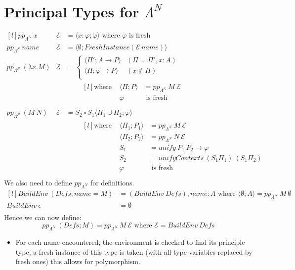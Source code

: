\section{Principal Types for $\Lambda^N$}
\[\begin{matrix*}[l]
    pp_{\Lambda^N} \ x & \mathcal{E} & = \langle x: \varphi ; \varphi \rangle \text{ where } \varphi \text{ is fresh} \\
    pp_{\Lambda^N} \ name & \mathcal{E} & = \langle \emptyset ; FreshInstance(\mathcal{E} \ name) \rangle \\
    pp_{\Lambda^N} \ (\lambda x . M) & \mathcal{E} & = \begin{cases}
        \langle \Pi'; A \to P \rangle & (\Pi = \Pi', x:A) \\
        \langle \Pi; \varphi \to P \rangle & (x \not\in \Pi) \\
    \end{cases} \\
    & & \qquad \begin{matrix*}[l]
        \text{where } & \langle \Pi; P \rangle & = pp_{\Lambda^N} \ M \ \mathcal{E} \\
        & \varphi & \text{ is fresh} \\
    \end{matrix*} \\
    pp_{\Lambda^N} \ (M \ N) & \mathcal{E} & = S_2 \circ S_1 \langle \Pi_1 \cup \Pi_2 ; \varphi \rangle \\
    & & \qquad \begin{matrix*}[l]
        \text{where } & \langle \Pi_1 ; P_1 \rangle & = pp_{\Lambda^N} \ M \ \mathcal{E} \\
        & \langle \Pi_2 ; P_2 \rangle & = pp_{\Lambda^N} \ N \ \mathcal{E} \\
        & S_1 & = unify \ P_1 \ P_2 \to \varphi \\
        & S_2 & = unifyContexts \ (S_1 \Pi_1) \ (S_1 \Pi_2) \\
        & \varphi & \text{ is fresh} \\
    \end{matrix*}
\end{matrix*}\]
We also need to define $pp_{\Lambda^N}$ for definitions.
\[\begin{matrix*}[l]
    BuildEnv \ (Defs ; name = M) & = (BuildEnv \ Defs), name:A \text{ where } \langle \emptyset; A \rangle = pp_{\Lambda^N} \ M \ \emptyset \\
    BuildEnv \ \epsilon & = \emptyset \\
\end{matrix*}\]
Hence we can now define:
\[pp_{\Lambda^N} \ (Defs; M) = pp_{\Lambda^N} \ M \ \mathcal{E} \text{ where } \mathcal{E} = BuildEnv \ Defs\]
\begin{itemize}
    \item For each name encountered, the environment is checked to find its principle type, a fresh instance of this type is taken (with all type variables replaced by fresh ones) this allows for polymorphism.
\end{itemize}

